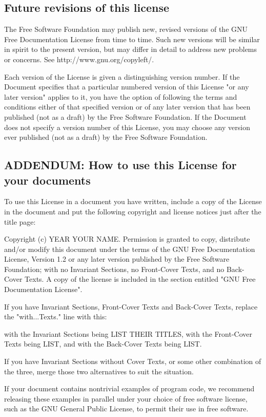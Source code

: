 \documentclass[11pt]{article}
\begin{document}
\subsection*{Future revisions of this license}

The Free Software Foundation may publish new, revised versions
of the GNU Free Documentation License from time to time.  Such new
versions will be similar in spirit to the present version, but may
differ in detail to address new problems or concerns.  See
http://www.gnu.org/copyleft/.

Each version of the License is given a distinguishing version number.
If the Document specifies that a particular numbered version of this
License "or any later version" applies to it, you have the option of
following the terms and conditions either of that specified version or
of any later version that has been published (not as a draft) by the
Free Software Foundation.  If the Document does not specify a version
number of this License, you may choose any version ever published (not
as a draft) by the Free Software Foundation.


\subsection*{ADDENDUM: How to use this License for your documents}

To use this License in a document you have written, include a copy of
the License in the document and put the following copyright and
license notices just after the title page:

    Copyright (c)  YEAR  YOUR NAME.
    Permission is granted to copy, distribute and/or modify this document
    under the terms of the GNU Free Documentation License, Version 1.2
    or any later version published by the Free Software Foundation;
    with no Invariant Sections, no Front-Cover Texts, and no Back-Cover Texts.
    A copy of the license is included in the section entitled "GNU
    Free Documentation License".

If you have Invariant Sections, Front-Cover Texts and Back-Cover Texts,
replace the "with...Texts." line with this:

    with the Invariant Sections being LIST THEIR TITLES, with the
    Front-Cover Texts being LIST, and with the Back-Cover Texts being LIST.

If you have Invariant Sections without Cover Texts, or some other
combination of the three, merge those two alternatives to suit the
situation.

If your document contains nontrivial examples of program code, we
recommend releasing these examples in parallel under your choice of
free software license, such as the GNU General Public License,
to permit their use in free software.
\end{document}
